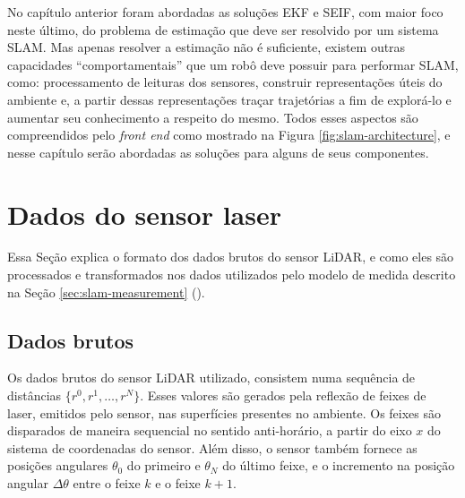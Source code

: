 No capítulo anterior foram abordadas as soluções EKF e SEIF, com maior 
foco neste último, do problema de estimação que deve ser resolvido por um 
sistema SLAM. Mas apenas resolver a estimação não é suficiente, existem 
outras capacidades ``comportamentais'' que um robô deve possuir para 
performar SLAM, como: processamento de leituras dos sensores, construir 
representações úteis do ambiente e, a partir dessas representações traçar 
trajetórias a fim de explorá-lo e aumentar seu conhecimento a respeito 
do mesmo. Todos esses aspectos são compreendidos pelo \textit{front end} 
como mostrado na Figura \ref{fig:slam-architecture}, e nesse capítulo serão abordadas as soluções para alguns de seus componentes.

\section{Dados do sensor laser}
Essa Seção explica o formato dos dados brutos do sensor LiDAR, e como eles 
são processados e transformados nos dados utilizados pelo modelo de medida 
descrito na Seção \ref{sec:slam-measurement} ().

\subsection{Dados brutos}
Os dados brutos do sensor LiDAR utilizado, consistem numa sequência de 
distâncias $\{r^0, r^1, \dots, r^N\}$. Esses valores são gerados pela reflexão de feixes de laser, emitidos pelo sensor, nas superfícies 
presentes no ambiente. Os feixes são disparados de maneira sequencial no 
sentido anti-horário, a partir do eixo $x$ do sistema de coordenadas do sensor. 
Além disso, o sensor também fornece as posições angulares $\theta_0$ 
do primeiro e $\theta_N$ do último feixe, e o incremento na posição angular $\Delta \theta$ entre o feixe $k$ e o feixe $k+1$.

